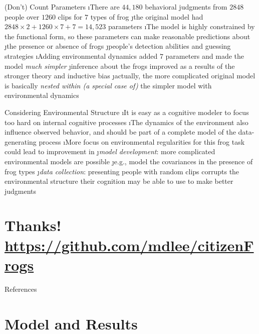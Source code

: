 \documentclass[10pt,t]{beamer}
\begin{document}
\begin{frame}[fragile]{(Don't) Count Parameters}
\vspace{-1em}
\bi
\i There are $44,180$ behavioral judgments from $2848$ people over $1260$ clips for $7$ types of frog
\bi 
\j the original model had $2848\times 2 + 1260\times 7 + 7=14,523$ parameters
\ei 
\i The model is highly constrained by the functional form, so these parameters can make reasonable predictions about
\bi
\j the presence or absence of frogs
\j people's detection abilities and guessing strategies
\ei
\i Adding environmental dynamics added $7$ parameters and made the model \emph{much simpler} 
\bi
\j inference about the frogs improved as a results of the stronger theory and inductive bias \cite{Vanpaemel2020}
\j actually, the more complicated original model is basically \emph{nested within (a special case of)} the simpler model with environmental dynamics \cite{Villarreal2023}
\ei
\ei 
\end{frame}

\begin{frame}[fragile]{Considering Environmental Structure}
\vspace{-1em}
\bi
\i It is easy as a cognitive modeler to focus too hard on internal cognitive processes
\i The dynamics of the environment also influence observed behavior, and should be part of a complete model of the data-generating process
\vspace{1em}
\i More focus on environmental regularities for this frog task could lead to improvement in
\bi
\j \emph{model development}: more complicated environmental models are possible
\bi 
\j e.g., model the covariances in the presence of frog types
\ei
\j \emph{data collection}: presenting people with random clips corrupts the environmental structure their cognition may be able to use to make better judgments \cite{whitney2014ensemble}
\ei
\ei 
\end{frame}

\section{Thanks! \\ \url{https://github.com/mdlee/citizenFrogs}}

\begin{frame}[allowframebreaks]{References}
{}{}

\end{frame}

\section{\protect{} Model and Results}
\end{document}
